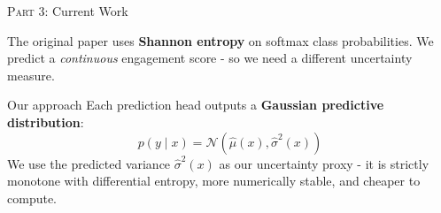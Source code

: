 \documentclass[aspectratio=169]{beamer}
\begin{document}
	\begin{frame}{\textsc{Part 3:} Current Work}
		\begin{center}
		\end{center}
		\vspace{0.5em}
		The original paper uses \textbf{Shannon entropy} on softmax class probabilities.
		We predict a \textit{continuous} engagement score - so we need a different uncertainty measure.
		
		\vspace{0.5em}
		\begin{block}{Our approach}
			Each prediction head outputs a \textbf{Gaussian predictive distribution}:
			$$p(y \mid x) = \mathcal{N}(\hat{\mu}(x), \hat{\sigma}^2(x))$$
			We use the predicted variance $\hat{\sigma}^2(x)$ as our uncertainty proxy - it is strictly monotone with differential entropy, more numerically stable, and cheaper to compute.
		\end{block}
	\end{frame}
	
\end{document}
